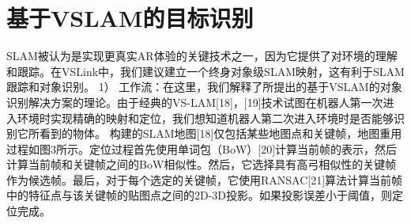 \section{基于VSLAM的目标识别}
SLAM被认为是实现更真实AR体验的关键技术之一，因为它提供了对环境的理解和跟踪。在VSLink中，我们建议建立一个终身对象级SLAM映射，这有利于SLAM跟踪和对象识别。
1） 工作流：在这里，我们解释了所提出的基于VSLAM的对象识别解决方案的理论。由于经典的VS-LAM[18]，[19]技术试图在机器人第一次进入环境时实现精确的映射和定位，我们想知道机器人第二次进入环境时是否能够识别它所看到的物体。
构建的SLAM地图[18]仅包括某些地图点和关键帧，地图重用过程如图3所示。定位过程首先使用单词包（BoW）[20]计算当前帧的表示，然后计算当前帧和关键帧之间的BoW相似性。然后，它选择具有高弓相似性的关键帧作为候选帧。最后，对于每个选定的关键帧，它使用RANSAC[21]算法计算当前帧中的特征点与该关键帧的贴图点之间的2D-3D投影。如果投影误差小于阈值，则定位完成。